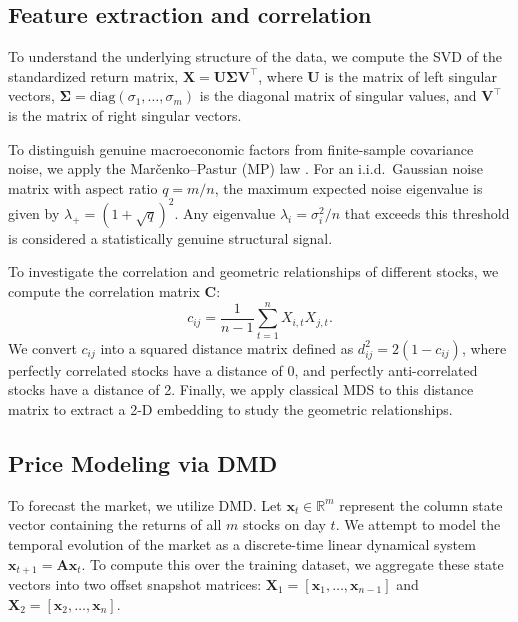 \documentclass[runningheads]{llncs}
\begin{document}
\subsection{Feature extraction and correlation}
To understand the underlying structure of the data, we compute the SVD of the standardized return matrix, $\mathbf{X} = \mathbf{U}\boldsymbol{\Sigma}\mathbf{V}^\top$, where $\mathbf{U}$ is the matrix of left singular vectors, $\boldsymbol{\Sigma} = \text{diag}(\sigma_1, \dots, \sigma_m)$ is the diagonal matrix of singular values, and $\mathbf{V}^\top$ is the matrix of right singular vectors.

To distinguish genuine macroeconomic factors from finite-sample covariance noise, we apply the Mar\v{c}enko--Pastur (MP) law \citep{marchenko1967distribution, laloux1999noise}. For an i.i.d.\ Gaussian noise matrix with aspect ratio $q = m/n$, the maximum expected noise eigenvalue is given by $\lambda_{+} = (1 + \sqrt{q})^2$. Any eigenvalue $\lambda_i = \sigma_i^2 / n$ that exceeds this threshold is considered a statistically genuine structural signal.

To investigate the correlation and geometric relationships of different stocks, we compute the correlation matrix $\mathbf{C}$:
\begin{equation}
    c_{ij} = \frac{1}{n-1} \sum_{t=1}^n X_{i,t} X_{j,t}.
\end{equation}
We convert $c_{ij}$ into a squared distance matrix defined as $d^2_{ij} = 2(1-c_{ij})$, where perfectly correlated stocks have a distance of 0, and perfectly anti-correlated stocks have a distance of 2. Finally, we apply classical MDS \citep{torgerson1952multidimensional} to this distance matrix to extract a 2-D embedding to study the geometric relationships.

\subsection{Price Modeling via DMD}
To forecast the market, we utilize DMD. Let $\mathbf{x}_t \in \mathbb{R}^m$ represent the column state vector containing the returns of all $m$ stocks on day $t$. We attempt to model the temporal evolution of the market as a discrete-time linear dynamical system $\mathbf{x}_{t+1} = \mathbf{A}\mathbf{x}_t$. To compute this over the training dataset, we aggregate these state vectors into two offset snapshot matrices: $\mathbf{X}_1 = [\mathbf{x}_1, \dots, \mathbf{x}_{n-1}]$ and $\mathbf{X}_2 = [\mathbf{x}_2, \dots, \mathbf{x}_n]$.
\end{document}
